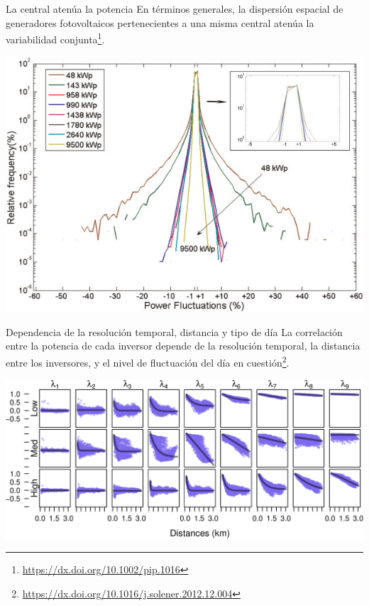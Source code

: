 \documentclass[aspectratio=169, usenames,svgnames,dvipsnames]{beamer}
\begin{document}
\begin{frame}[label={sec:org3338da8}]{La central atenúa la potencia}
En términos generales, la \alert{dispersión espacial} de generadores
fotovoltaicos pertenecientes a \alert{una misma central} \alert{atenúa} la
variabilidad conjunta\footnote{\url{https://dx.doi.org/10.1002/pip.1016}}.

\begin{center}
\includegraphics[height=0.7\textheight]{../figs/Variabilidad_DispersionGeografica_Planta.png}
\end{center}
\end{frame}

\begin{frame}[label={sec:orgb821313}]{Dependencia de la resolución temporal, distancia y tipo de día}
La correlación entre la potencia de cada inversor \alert{depende} de la \alert{resolución temporal}, la \alert{distancia} entre los inversores, y el \alert{nivel de fluctuación del día} en cuestión\footnote{\url{https://dx.doi.org/10.1016/j.solener.2012.12.004}}.

\begin{center}
\includegraphics[height=0.6\textheight]{../figs/corDistMatrix_nls.png}
\end{center}
\end{frame}
\end{document}
